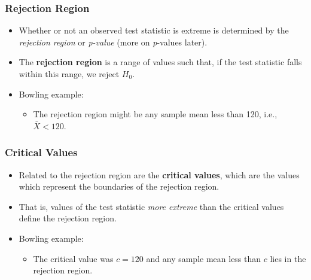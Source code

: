 \documentclass[12pt]{beamer}
\begin{document}
\begin{frame}
	\frametitle{Rejection Region}
	
	\begin{itemize}[label={\color{blue}$\blacktriangleright$}]
		\item Whether or not an observed test statistic is extreme is determined by the \textit{rejection region} or \textit{p-value} (more on \textit{p}-values later).
		
		\item The \textbf{rejection region} is a range of values such that, if the test statistic falls within this range, we reject $H_0$.
		
		\item Bowling example:
		\begin{itemize}[label={\color{blue}$\blacktriangleright$}]
			\item The rejection region might be any sample mean less than 120, i.e., $\bar{X} < 120$.
		\end{itemize}
	\end{itemize}
	
\end{frame}
\begin{frame}
	\frametitle{Critical Values}
	
	\begin{itemize}[label={\color{blue}$\blacktriangleright$}]
		\item Related to the rejection region are the {\bf critical values}, which are the values which represent the boundaries of the rejection region.
		
		\item That is, values of the test statistic {\sl more extreme }than the critical values define the rejection region.
		
		\item Bowling example:
		\begin{itemize}[label={\color{blue}$\blacktriangleright$}]
			\item The critical value was $c = 120$ and any sample mean less than $c$ lies in the rejection region.
		\end{itemize}
	\end{itemize}
	
\end{frame}
\end{document}
